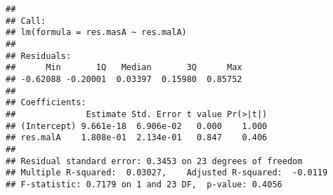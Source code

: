 \documentclass[]{article}
\newenvironment{Shaded}{\begin{snugshade}}{\end{snugshade}}
\newcommand{\KeywordTok}[1]{\textcolor[rgb]{0.13,0.29,0.53}{\textbf{#1}}}
\newcommand{\DataTypeTok}[1]{\textcolor[rgb]{0.13,0.29,0.53}{#1}}
\newcommand{\DecValTok}[1]{\textcolor[rgb]{0.00,0.00,0.81}{#1}}
\newcommand{\StringTok}[1]{\textcolor[rgb]{0.31,0.60,0.02}{#1}}
\newcommand{\CommentTok}[1]{\textcolor[rgb]{0.56,0.35,0.01}{\textit{#1}}}
\newcommand{\OperatorTok}[1]{\textcolor[rgb]{0.81,0.36,0.00}{\textbf{#1}}}
\newcommand{\NormalTok}[1]{#1}
\begin{document}
\begin{Shaded}
\end{Shaded}

\begin{verbatim}
## 
## Call:
## lm(formula = res.masA ~ res.malA)
## 
## Residuals:
##      Min       1Q   Median       3Q      Max 
## -0.62088 -0.20001  0.03397  0.15980  0.85752 
## 
## Coefficients:
##              Estimate Std. Error t value Pr(>|t|)
## (Intercept) 9.661e-18  6.906e-02   0.000    1.000
## res.malA    1.808e-01  2.134e-01   0.847    0.406
## 
## Residual standard error: 0.3453 on 23 degrees of freedom
## Multiple R-squared:  0.03027,    Adjusted R-squared:  -0.0119 
## F-statistic: 0.7179 on 1 and 23 DF,  p-value: 0.4056
\end{verbatim}
\end{document}
